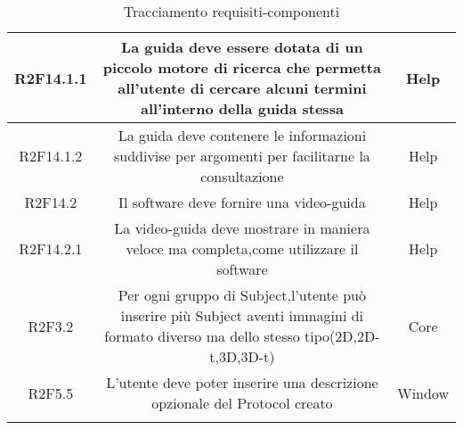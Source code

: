 \begin{center}
\begin{longtable}{|c|c|c|}
\hline
R2F14.1.1   & \parbox[t]{\larghezza}{La guida deve essere dotata di un piccolo motore di ricerca che permetta all'utente di cercare alcuni termini all'interno della guida stessa}  & \parbox[t]{\dimFonti}{ Help \\} \\
\hline
R2F14.1.2   & \parbox[t]{\larghezza}{La guida deve contenere le informazioni suddivise per argomenti per facilitarne la consultazione}  & \parbox[t]{\dimFonti}{ Help \\} \\
\hline
R2F14.2   & \parbox[t]{\larghezza}{Il software deve fornire una video-guida }  & \parbox[t]{\dimFonti}{ Help \\} \\
\hline
R2F14.2.1   & \parbox[t]{\larghezza}{La video-guida deve mostrare in maniera veloce ma completa,come utilizzare il software }  & \parbox[t]{\dimFonti}{ Help \\} \\
\hline
R2F3.2   & \parbox[t]{\larghezza}{Per ogni gruppo di Subject,l'utente può inserire più Subject aventi immagini di formato diverso ma dello stesso tipo(2D,2D-t,3D,3D-t)}  & \parbox[t]{\dimFonti}{ Core \\} \\
\hline
R2F5.5   & \parbox[t]{\larghezza}{L'utente deve poter inserire una descrizione opzionale del Protocol creato }  & \parbox[t]{\dimFonti}{ Window \\} \\
\hline
\caption{Tracciamento requisiti-componenti}
\end{longtable}
\end{center}
